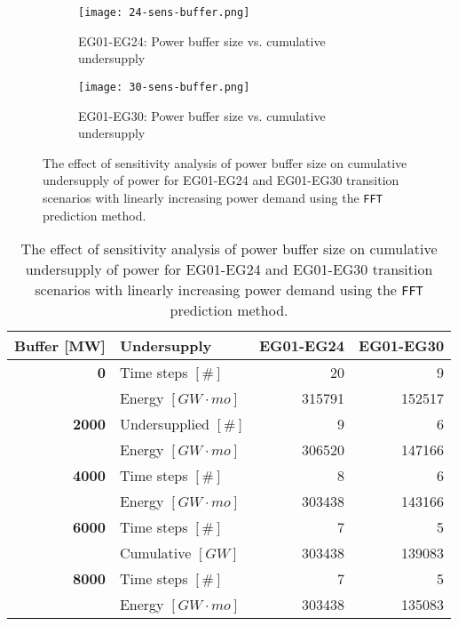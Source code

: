 \begin{figure}[]
	\centering
	\begin{subfigure}[t]{\textwidth}
		\centering
		\texttt{[image: 24-sens-buffer.png]} 
		\caption{EG01-EG24: Power buffer size vs. cumulative undersupply}
		\label{fig:eg24-bufplot}
	\end{subfigure}
	\begin{subfigure}[t]{\textwidth}
		\centering
		\texttt{[image: 30-sens-buffer.png]} 
		\caption{EG01-EG30: Power buffer size vs. cumulative undersupply}
		\label{fig:eg30-bufplot}
	\end{subfigure}
	\hfill
	\caption{The effect of sensitivity analysis of power buffer size on cumulative 
	undersupply of power for EG01-EG24 and EG01-EG30 transition scenarios 
	with linearly increasing power demand using the \texttt{FFT} prediction method.}
	\label{fig:sabuffer}
\end{figure}

\begin{table}[]
	\centering
	\caption{The effect of sensitivity analysis of power buffer size on cumulative 
	undersupply of power for EG01-EG24 and EG01-EG30 transition scenarios with linearly 
	increasing power demand using the \texttt{FFT} prediction method.}
	\label{tab:buff_size}
	\footnotesize
		\begin{tabular}{r|lrr}
                \hline
        \textbf{Buffer [MW]}     & \textbf{Undersupply}             & \textbf{EG01-EG24}   & \textbf{EG01-EG30} \\
		\hline
		\textbf{0}             & Time steps $[\#]$ & 20 & 9\\  
                      & Energy $[GW\cdot mo]$    & 315791 & 152517 \\ \hline
		\textbf{2000}          & Undersupplied $[\#]$ & 9 & 6 \\  
        	      & Energy $[GW\cdot mo]$    & 306520 & 147166 \\ \hline
        \textbf{4000}          & Time steps $[\#]$ & 8 & 6 \\  
				  & Energy $[GW\cdot mo]$    & 303438 & 143166 \\ \hline
		\textbf{6000}          & Time steps $[\#]$ & 7 & 5 \\  
		& Cumulative $[GW]$    & 303438 & 139083 \\ \hline
        \textbf{8000}          & Time steps $[\#]$ & 7 & 5  \\  
	              & Energy $[GW\cdot mo]$    & 303438 & 135083 \\ \hline
	\end{tabular}
\end{table}

